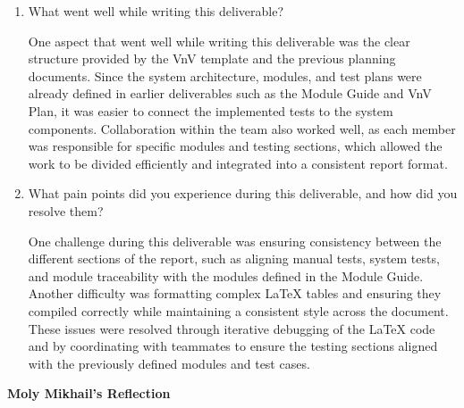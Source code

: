 \documentclass[12pt, titlepage]{article}
\begin{document}
\begin{enumerate}
  \item What went well while writing this deliverable?

    One aspect that went well while writing this deliverable was the
    clear structure provided by the VnV template and the previous
    planning documents. Since the system architecture, modules, and
    test plans were already defined in earlier deliverables such as
    the Module Guide and VnV Plan, it was easier to connect the
    implemented tests to the system components.
    Collaboration within the team also worked well, as each member
    was responsible for specific modules and testing sections, which
    allowed the work to be divided efficiently and integrated into a
    consistent report format.

  \item What pain points did you experience during this deliverable, and how
    did you resolve them?

    One challenge during this deliverable was ensuring consistency
    between the different sections of the report, such as aligning
    manual tests, system tests, and module traceability with the
    modules defined in the Module Guide. Another difficulty was
    formatting complex LaTeX tables and ensuring they compiled
    correctly while maintaining a consistent style across the
    document. These issues were resolved through iterative debugging
    of the LaTeX code and by coordinating with teammates to ensure
    the testing sections aligned with the previously defined modules
    and test cases.

\end{enumerate}

\textbf{Moly Mikhail's Reflection}
\end{document}
